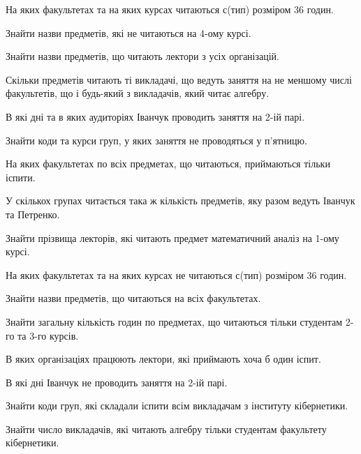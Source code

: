 \begin{card}
    \item На яких факультетах  та на яких курсах читаються с (тип) розміром 36 годин.
    \item Знайти назви предметів, які не читаються на 4-ому курсі.
    \item Знайти назви предметів, що читають лектори з усіх організацій.
    \item Скільки предметів читають ті викладачі, що ведуть заняття на не меншому числі факультетів, що і будь-який з викладачів, який читає алгебру.
\end{card}

\begin{card}
    \item В які дні та в яких аудиторіях Іванчук проводить заняття на 2-ій парі.
    \item Знайти коди та курси груп, у яких заняття не проводяться у п'ятницю.
    \item На яких факультетах по всіх предметах, що читаються, приймаються тільки іспити.  
    \item У скількох групах читається така ж кількість предметів, яку разом ведуть Іванчук та Петренко.
\end{card}

\begin{card}
    \item Знайти прізвища лекторів, які читають предмет математичний аналіз на 1-ому курсі.
    \item На яких факультетах  та на яких курсах не читаються с (тип) розміром 36 годин.
    \item Знайти назви предметів, що читаються на всіх факультетах.
    \item Знайти загальну кількість годин по предметах, що читаються тільки студентам 2-го та 3-го курсів.
\end{card}

\begin{card}
    \item В яких організаціях працюють лектори, які приймають хоча б один іспит.
    \item В які дні  Іванчук не проводить заняття на 2-ій парі.
    \item Знайти коди груп, які складали іспити всім викладачам з інституту кібернетики.
    \item Знайти число викладачів, які читають алгебру тільки студентам факультету кібернетики.
\end{card}

